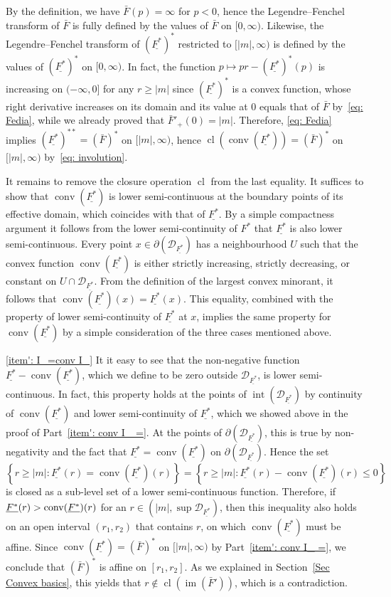 \documentclass[10pt]{amsart}
\theoremstyle{definition}\newtheorem{defi}[theo]{Definition}\newtheorem{rema}[theo]{Remark}\newtheorem{exam}[theo]{Example}\newtheorem{exem}[theo]{Example}\newtheorem{nota}[theo]{Notation}
\DeclareMathOperator{\conv}{conv}
\DeclareMathOperator{\im}{im}
\DeclareMathOperator{\cl}{cl}
\DeclareMathOperator{\intr}{int}
\newcommand{\ubar}[1]{\underline{#1}}
\newcommand{\Dcl}{\mathcal{D}}
\begin{document}
\begin{proofc}
By the definition, we have $\bar F(p)=\infty$ for $p<0$, hence the Legendre--Fenchel transform of $\bar F$ is fully defined by the values of $\bar F$ on $[0, \infty)$. Likewise, the Legendre--Fenchel transform of $(\ubar{F^*})^*$ restricted to $[|m|, \infty)$ is defined by the values of $(\ubar{F^*})^*$ on $[0, \infty)$. In fact, the function $p \mapsto pr - (\ubar{F^*})^*(p)$ is increasing on $(-\infty, 0]$ for any $r \ge |m|$ since $(\ubar{F^*})^*$ is a convex function, whose right derivative increases on its domain and its value at $0$ equals that of $\bar F$ by~\eqref{eq: Fedia}, while we already proved that $\bar F'_+(0)=|m|$. Therefore, \eqref{eq: Fedia} implies $(\ubar{F^*})^{**} = (\bar F)^*$ on $[|m|, \infty)$, hence $\cl (\conv(\ubar{F^*}))= (\bar F)^*$ on $[|m|, \infty)$ by~\eqref{eq: involution}.

It remains to remove the closure operation $\cl$ from the last equality. It suffices to show that $\conv(\ubar{F^*})$ is lower semi-continuous at the boundary points of its effective domain, which coincides with that of $\ubar{F^*}$. By a simple compactness argument it follows from the lower semi-continuity of $F^*$ that $\ubar{F^*}$ is also lower semi-continuous. Every point $x \in \partial (\Dcl_{\ubar {F^*}})$ has a neighbourhood $U$ such that the convex function $\conv(\ubar{F^*})$ is either strictly increasing, strictly decreasing, or constant on $U \cap \Dcl_{\ubar {F^*}}$. From the definition of the largest convex minorant, it follows that $\conv(\ubar{F^*})(x)= \ubar{F^*}(x)$. This equality, combined with the property of lower semi-continuity of $\ubar{F^*}$ at $x$, implies the same property for $\conv(\ubar{F^*})$ by a simple consideration of the three cases mentioned above.

\eqref{item': I_=conv I_} It it easy to see that the non-negative function $\ubar {F^*} - \conv (\ubar {F^*})$, which we define to be zero outside $\Dcl_{\ubar {F^*}}$, is lower semi-continuous. In fact, this property holds at the points of $\intr (\Dcl_{\ubar {F^*}})$ by continuity of $\conv (\ubar {F^*})$ and lower semi-continuity of $\ubar {F^*}$, which we showed above in the proof of Part~\eqref{item': conv I_ =}. At the points of $\partial (\Dcl_{\ubar {F^*}})$, this is true by non-negativity and the fact that $\ubar {F^*} = \conv (\ubar {F^*})$ on $\partial (\Dcl_{\ubar {F^*}})$. Hence the set
\[
\left\{r \ge |m|: \ubar {F^*}(r) = \conv (\ubar {F^*})(r)\right\} = \left\{r \ge |m|: \ubar {F^*}(r) -\conv (\ubar {F^*})(r) \le 0\right\}
\]
is closed as a sub-level set of a lower semi-continuous function. Therefore, if $\ubar {F^*}(r)\linebreak >\conv (\ubar {F^*})(r)$ for an $r \in (|m|, \sup \Dcl_{\ubar {F^*}})$, then this inequality also holds on an open interval $(r_1, r_2)$ that contains $r$, on which $\conv (\ubar {F^*})$ must be affine. Since $\conv (\ubar {F^*})=(\bar F)^*$ on $[|m|, \infty)$ by Part~\eqref{item': conv I_ =}, we conclude that $(\bar F)^*$ is affine on $[r_1, r_2]$. As we explained in Section~\ref{Sec Convex basics}, this yields that $r \not \in \cl(\im(\bar F'))$, which is a contradiction.


\end{proofc}
\end{document}
